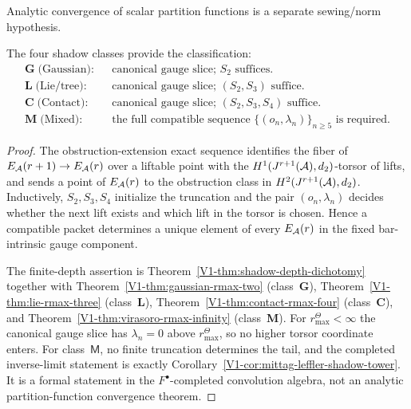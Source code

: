 \begin{theorem}
\begin{itemize}
 Analytic convergence of scalar partition functions is a separate
 sewing/norm hypothesis.
\end{itemize}
The four shadow classes provide the classification:
\[
\begin{array}{lcl}
\textbf{G}\;\text{(Gaussian)}: & &
 \text{canonical gauge slice; } S_2 \text{ suffices.}\\
\textbf{L}\;\text{(Lie/tree)}: & &
 \text{canonical gauge slice; } (S_2,S_3) \text{ suffice.}\\
\textbf{C}\;\text{(Contact)}: & &
 \text{canonical gauge slice; } (S_2,S_3,S_4) \text{ suffice.}\\
\textbf{M}\;\text{(Mixed)}: & &
 \text{the full compatible sequence }
 \{(o_n,\lambda_n)\}_{n\ge5} \text{ is required.}
\end{array}
\]
\end{theorem}

\begin{proof}
The obstruction-extension exact sequence identifies the fiber of
\(E_{\mathcal{A}}(r+1)\to E_{\mathcal{A}}(r)\) over a liftable point with the
\(H^1(J^{r+1}(\mathcal{A}),d_2)\)-torsor of lifts, and sends a point of
\(E_{\mathcal{A}}(r)\) to the obstruction class in
\(H^2(J^{r+1}(\mathcal{A}),d_2)\).  Inductively, \(S_2,S_3,S_4\) initialize
the truncation and the pair \((o_n,\lambda_n)\) decides whether the
next lift exists and which lift in the torsor is chosen.  Hence a
compatible packet determines a unique element of every \(E_{\mathcal{A}}(r)\)
in the fixed bar-intrinsic gauge component.

The finite-depth assertion is
Theorem~\ref{V1-thm:shadow-depth-dichotomy} together with
Theorem~\ref{V1-thm:gaussian-rmax-two} (class~\textbf{G}),
Theorem~\ref{V1-thm:lie-rmax-three} (class~\textbf{L}),
Theorem~\ref{V1-thm:contact-rmax-four} (class~\textbf{C}),
and
Theorem~\ref{V1-thm:virasoro-rmax-infinity} (class~\textbf{M}).
For \(r^\Theta_{\max}<\infty\) the canonical gauge slice has
\(\lambda_n=0\) above \(r^\Theta_{\max}\), so no higher torsor coordinate
enters.  For class~\(\mathsf M\), no finite truncation determines the
tail, and the completed inverse-limit statement is exactly
Corollary~\ref{V1-cor:mittag-leffler-shadow-tower}.  It is a formal
statement in the \(F^\bullet\)-completed convolution algebra, not an
analytic partition-function convergence theorem.
\end{proof}

